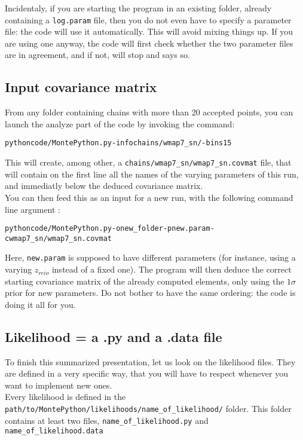 \documentclass[10pt]{article}
\begin{document}
  Incidentaly, if you are starting the program in an existing folder, already
  containing a \verb?log.param? file, then you do not even have to specify a
  parameter file: the code will use it automatically. This will avoid mixing
  things up. If you are using one anyway, the code will first check whether the
  two parameter files are in agreement, and if not, will stop and says so.\\

  \subsection{Input covariance matrix}

  From any folder containing chains with more than 20 accepted points, you can
  launch the analyze part of the code by invoking the command:
  \begin{alltt}
    python code/MontePython.py -info chains/wmap7_sn/ -bins 15
  \end{alltt}
  This will create, among other, a \verb?chains/wmap7_sn/wmap7_sn.covmat? file,
  that will contain on the first line all the names of the varying parameters
  of this run, and immediatly below the deduced covariance matrix.\\

  You can then feed this as an input for a new run, with the following command
  line argument :
  \begin{alltt}
    python code/MontePython.py -o new_folder -p new.param -c wmap7_sn/wmap7_sn.covmat
  \end{alltt}
  Here, \verb?new.param? is supposed to have different parameters (for
  instance, using a varying $z_{reio}$ instead of a fixed one). The program
  will then deduce the correct starting covariance matrix of the already
  computed elements, only using the $1\sigma$ prior for new parameters. Do not
  bother to have the same ordering: the code is doing it all for you.

  \subsection{Likelihood = a .py and a .data file\label{ssec:lkl}}

  To finish this summarized presentation, let us look on the likelihood files.
  They are defined in a very specific way, that you will have to respect
  whenever you want to implement new ones.\\

  Every likelihood is defined in the
  \verb?path/to/MontePython/likelihoods/name_of_likelihood/?
  folder. This folder contains at least two files, \verb?name_of_likelihood.py?
  and \verb?name_of_likelihood.data?\\
\end{document}
